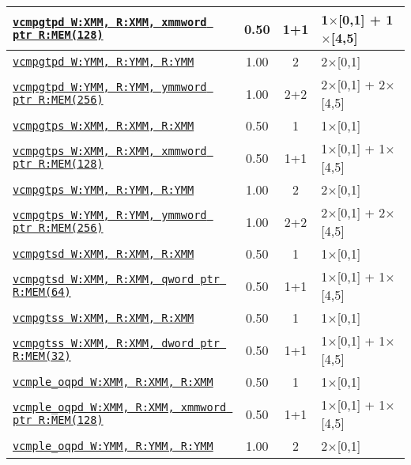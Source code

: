 \documentclass[a4paper,english,fontsize=9]{scrartcl}
\begin{document}
\begin{longtable}{p{}ccL{.25\textwidth}}
  \midrule
  \texttt{\href{https://felixcloutier.com/x86/CMPPD.html}{vcmpgtpd W:XMM, R:XMM, xmmword ptr R:MEM(128)}} & 0.50 & 1+1 & 1\(\times\)[0,1] + 1\(\times\)[4,5] \\
  \midrule
  \texttt{\href{https://felixcloutier.com/x86/CMPPD.html}{vcmpgtpd W:YMM, R:YMM, R:YMM}} & 1.00 & 2 & 2\(\times\)[0,1] \\
  \midrule
  \texttt{\href{https://felixcloutier.com/x86/CMPPD.html}{vcmpgtpd W:YMM, R:YMM, ymmword ptr R:MEM(256)}} & 1.00 & 2+2 & 2\(\times\)[0,1] + 2\(\times\)[4,5] \\
  \midrule
  \texttt{\href{https://felixcloutier.com/x86/CMPPS.html}{vcmpgtps W:XMM, R:XMM, R:XMM}} & 0.50 & 1 & 1\(\times\)[0,1] \\
  \midrule
  \texttt{\href{https://felixcloutier.com/x86/CMPPS.html}{vcmpgtps W:XMM, R:XMM, xmmword ptr R:MEM(128)}} & 0.50 & 1+1 & 1\(\times\)[0,1] + 1\(\times\)[4,5] \\
  \midrule
  \texttt{\href{https://felixcloutier.com/x86/CMPPS.html}{vcmpgtps W:YMM, R:YMM, R:YMM}} & 1.00 & 2 & 2\(\times\)[0,1] \\
  \midrule
  \texttt{\href{https://felixcloutier.com/x86/CMPPS.html}{vcmpgtps W:YMM, R:YMM, ymmword ptr R:MEM(256)}} & 1.00 & 2+2 & 2\(\times\)[0,1] + 2\(\times\)[4,5] \\
  \midrule
  \texttt{\href{https://felixcloutier.com/x86/CMPSD.html}{vcmpgtsd W:XMM, R:XMM, R:XMM}} & 0.50 & 1 & 1\(\times\)[0,1] \\
  \midrule
  \texttt{\href{https://felixcloutier.com/x86/CMPSD.html}{vcmpgtsd W:XMM, R:XMM, qword ptr R:MEM(64)}} & 0.50 & 1+1 & 1\(\times\)[0,1] + 1\(\times\)[4,5] \\
  \midrule
  \texttt{\href{https://felixcloutier.com/x86/CMPSS.html}{vcmpgtss W:XMM, R:XMM, R:XMM}} & 0.50 & 1 & 1\(\times\)[0,1] \\
  \midrule
  \texttt{\href{https://felixcloutier.com/x86/CMPSS.html}{vcmpgtss W:XMM, R:XMM, dword ptr R:MEM(32)}} & 0.50 & 1+1 & 1\(\times\)[0,1] + 1\(\times\)[4,5] \\
  \midrule
  \texttt{\href{https://felixcloutier.com/x86/CMPPD.html}{vcmple\_oqpd W:XMM, R:XMM, R:XMM}} & 0.50 & 1 & 1\(\times\)[0,1] \\
  \midrule
  \texttt{\href{https://felixcloutier.com/x86/CMPPD.html}{vcmple\_oqpd W:XMM, R:XMM, xmmword ptr R:MEM(128)}} & 0.50 & 1+1 & 1\(\times\)[0,1] + 1\(\times\)[4,5] \\
  \midrule
  \texttt{\href{https://felixcloutier.com/x86/CMPPD.html}{vcmple\_oqpd W:YMM, R:YMM, R:YMM}} & 1.00 & 2 & 2\(\times\)[0,1] \\

\end{longtable}
\end{document}
